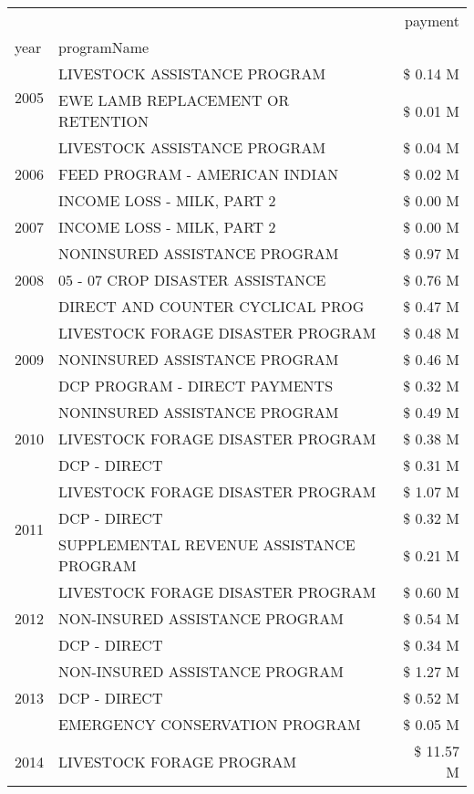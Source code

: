 \begin{tabular}{llr}
\toprule
 &  & payment \\
year & programName &  \\
\midrule
\multirow[t]{2}{*}{2005} & LIVESTOCK ASSISTANCE PROGRAM & \$ 0.14 M \\
 & EWE LAMB REPLACEMENT OR RETENTION & \$ 0.01 M \\
\cline{1-3}
\multirow[t]{3}{*}{2006} & LIVESTOCK ASSISTANCE PROGRAM & \$ 0.04 M \\
 & FEED PROGRAM - AMERICAN INDIAN & \$ 0.02 M \\
 & INCOME LOSS - MILK, PART 2 & \$ 0.00 M \\
\cline{1-3}
2007 & INCOME LOSS - MILK, PART 2 & \$ 0.00 M \\
\cline{1-3}
\multirow[t]{3}{*}{2008} & NONINSURED ASSISTANCE PROGRAM & \$ 0.97 M \\
 & 05 - 07 CROP DISASTER ASSISTANCE & \$ 0.76 M \\
 & DIRECT AND COUNTER CYCLICAL PROG & \$ 0.47 M \\
\cline{1-3}
\multirow[t]{3}{*}{2009} & LIVESTOCK FORAGE DISASTER  PROGRAM & \$ 0.48 M \\
 & NONINSURED ASSISTANCE PROGRAM & \$ 0.46 M \\
 & DCP PROGRAM - DIRECT PAYMENTS & \$ 0.32 M \\
\cline{1-3}
\multirow[t]{3}{*}{2010} & NONINSURED ASSISTANCE PROGRAM & \$ 0.49 M \\
 & LIVESTOCK FORAGE DISASTER PROGRAM & \$ 0.38 M \\
 & DCP - DIRECT & \$ 0.31 M \\
\cline{1-3}
\multirow[t]{3}{*}{2011} & LIVESTOCK FORAGE DISASTER PROGRAM & \$ 1.07 M \\
 & DCP - DIRECT & \$ 0.32 M \\
 & SUPPLEMENTAL REVENUE ASSISTANCE PROGRAM & \$ 0.21 M \\
\cline{1-3}
\multirow[t]{3}{*}{2012} & LIVESTOCK FORAGE DISASTER PROGRAM & \$ 0.60 M \\
 & NON-INSURED ASSISTANCE PROGRAM & \$ 0.54 M \\
 & DCP - DIRECT & \$ 0.34 M \\
\cline{1-3}
\multirow[t]{3}{*}{2013} & NON-INSURED ASSISTANCE PROGRAM & \$ 1.27 M \\
 & DCP - DIRECT & \$ 0.52 M \\
 & EMERGENCY CONSERVATION PROGRAM & \$ 0.05 M \\
\cline{1-3}
\multirow[t]{3}{*}{2014} & LIVESTOCK FORAGE PROGRAM & \$ 11.57 M \\

\end{tabular}
